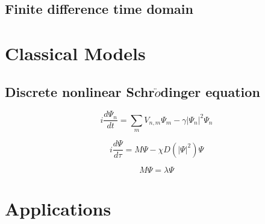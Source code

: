 \documentclass[%
 reprint,
 amsmath,amssymb,
 aps,
rmp,
]{revtex4-1}
\begin{document}
\subsection{Finite difference time domain}

\section{Classical Models}
\subsection{Discrete nonlinear Schr$\ddot{o}$dinger equation}
\begin{equation}
i \frac{d\Psi_n}{dt} = \sum_m V_{n,m} \Psi_m - \gamma |\Psi_n|^2 \Psi_n
\end{equation}

\begin{equation}
i \frac{d\Psi}{d\tau} = M \Psi - \chi D(|\Psi|^2) \Psi
\end{equation}

\begin{equation}
M \Psi = \lambda \Psi
\end{equation}

\section{Applications}
\end{document}
